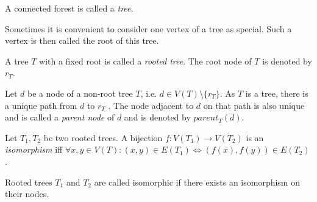 \begin{definition}
  A connected forest is called a {\em tree}.
\end{definition}

Sometimes it is convenient to consider one vertex of a tree as special. Such a vertex is then called the root of this tree.

\begin{definition}
  A tree $T$ with a fixed root is called a {\em rooted tree}. The root node of $T$ is denoted by $r_T$.
\end{definition}

\begin{definition}
  Let $d$ be a node of a non-root tree $T$, i.e. $d\in V(T)\setminus \{r_T\}$. As $T$ is a tree, there is a unique path from $d$ to $r_T$ \cite{Diestel97Graphs}. The node adjacent to $d$ on that path is also unique and is called a {\em parent node} of $d$ and is denoted by $parent_T(d)$.
\end{definition}

\begin{definition}
  Let $T_1, T_2$ be two rooted trees. A bijection $f: V(T_1)\rightarrow V(T_2)$ is an {\em isomorphism} iff $\forall x,y\in V(T): (x,y)\in E(T_1)\Leftrightarrow (f(x), f(y))\in E(T_2)$.
\end{definition}

Rooted trees $T_1$ and $T_2$ are called isomorphic if there exists an isomorphism on their nodes.
